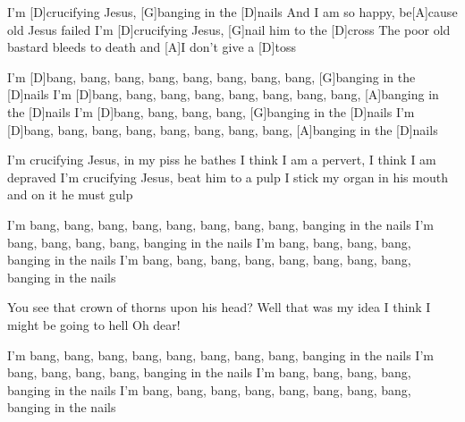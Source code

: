 

\begin{guitar}
	I'm [D]crucifying Jesus, [G]banging in the [D]nails
	And I am so happy, be[A]cause old Jesus failed
	I'm [D]crucifying Jesus, [G]nail him to the [D]cross
	The poor old bastard bleeds to death and [A]I don't give a [D]toss
	
	I'm [D]bang, bang, bang, bang, bang, bang, bang, bang, [G]banging in the [D]nails
	I'm [D]bang, bang, bang, bang, bang, bang, bang, bang, [A]banging in the [D]nails
	I'm [D]bang, bang, bang, bang, [G]banging in the [D]nails
	I'm [D]bang, bang, bang, bang, bang, bang, bang, bang, [A]banging in the [D]nails
	
	I'm crucifying Jesus, in my piss he bathes
	I think I am a pervert, I think I am depraved
	I'm crucifying Jesus, beat him to a pulp
	I stick my organ in his mouth and on it he must gulp
	
	I'm bang, bang, bang, bang, bang, bang, bang, bang, banging in the nails
	I'm bang, bang, bang, bang, banging in the nails
	I'm bang, bang, bang, bang, banging in the nails
	I'm bang, bang, bang, bang, bang, bang, bang, bang, banging in the nails
	
	You see that crown of thorns upon his head?
	Well that was my idea
	I think I might be going to hell
	Oh dear!
	
	I'm bang, bang, bang, bang, bang, bang, bang, bang, banging in the nails
	I'm bang, bang, bang, bang, banging in the nails
	I'm bang, bang, bang, bang, banging in the nails
	I'm bang, bang, bang, bang, bang, bang, bang, bang, banging in the nails
\end{guitar}